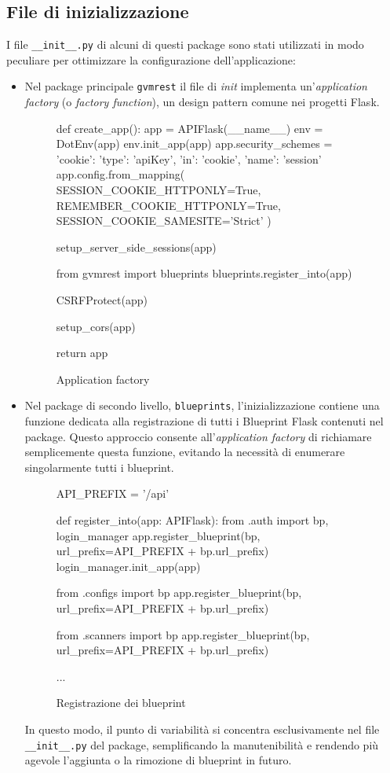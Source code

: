 \subsection{File di inizializzazione}
I file \texttt{\_\_init\_\_.py} di alcuni di questi package sono stati utilizzati in modo peculiare per ottimizzare la configurazione dell'applicazione:
\begin{itemize}
    \item Nel package principale \texttt{gvmrest} il file di \emph{init} implementa un'\emph{application factory} (o \emph{factory function}), un design pattern comune nei progetti Flask.

\begin{figure}
\begin{pycode}
def create_app():
    app = APIFlask(__name__)
    env = DotEnv(app)
    env.init_app(app)
    app.security_schemes = {
        'cookie': {
            'type': 'apiKey',
            'in': 'cookie',
            'name': 'session'
        }
    }
    app.config.from_mapping(
        SESSION_COOKIE_HTTPONLY=True,
        REMEMBER_COOKIE_HTTPONLY=True,
        SESSION_COOKIE_SAMESITE='Strict'
    )

    setup_server_side_sessions(app)

    from gvmrest import blueprints
    blueprints.register_into(app)

    CSRFProtect(app)

    setup_cors(app)

    return app
\end{pycode}
\caption{Application factory}
\end{figure}

    \item Nel package di secondo livello, \texttt{blueprints}, l'inizializzazione contiene una funzione dedicata alla registrazione di tutti i Blueprint Flask contenuti nel package. Questo approccio consente all'\emph{application factory} di richiamare semplicemente questa funzione, evitando la necessità di enumerare singolarmente tutti i blueprint.

\begin{figure}
\begin{pycode}
API_PREFIX = '/api'

def register_into(app: APIFlask):
    from .auth import bp, login_manager
    app.register_blueprint(bp, url_prefix=API_PREFIX + bp.url_prefix)
    login_manager.init_app(app)
    
    from .configs import bp
    app.register_blueprint(bp, url_prefix=API_PREFIX + bp.url_prefix)
    
    from .scanners import bp
    app.register_blueprint(bp, url_prefix=API_PREFIX + bp.url_prefix)

    ...
\end{pycode}
\caption{Registrazione dei blueprint}
\end{figure}
    
    In questo modo, il punto di variabilità si concentra esclusivamente nel file \texttt{\_\_init\_\_.py} del package, semplificando la manutenibilità e rendendo più agevole l'aggiunta o la rimozione di blueprint in futuro.
\end{itemize}

